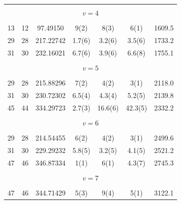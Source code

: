 \documentclass[twocolumn]{aastex62}
\begin{document}
\begin{table}[h!]
\begin{tabular}{ccccccc}
&\vspace{-0.75em}\\
\multicolumn{7}{c}{$v = 4$} \\
\vspace{-0.75em}\\

13 & 12 & 97.49150 & 9(2)		& 8(3) 		& 6(1) & 1609.5 \\
29 & 28 & 217.22742 & 1.7(6)	& 3.2(6) 	& 3.5(6) & 1733.2 \\
31 & 30 & 232.16021 & 6.7(6)	& 3.9(6)	& 6.6(8) & 1755.1 \\

&\vspace{-0.75em}\\
\multicolumn{7}{c}{$v = 5$} \\
\vspace{-0.75em}\\

29 & 28 & 215.88296 & 7(2) 		& 4(2)		& 3(1) & 2118.0 \\
31 & 30 & 230.72302 & 6.5(4)	& 4.3(4) 	& 5.2(5) & 2139.8 \\
45 & 44 & 334.29723 & 2.7(3)	& 16.6(6)	& 42.3(5) & 2332.2 \\

&\vspace{-0.75em}\\
\multicolumn{7}{c}{$v = 6$} \\
\vspace{-0.75em}\\

29 & 28 & 214.54455 & 6(2)		& 4(2) 		& 3(1) & 2499.6 \\
31 & 30 & 229.29232 & 5.8(5)	& 3.2(5) 	& 4.1(5) & 2521.2 \\
47 & 46 & 346.87334 & 1(1)		& 6(1) 		& 4.3(7) & 2745.3 \\

&\vspace{-0.75em}\\
\multicolumn{7}{c}{$v = 7$} \\
\vspace{-0.75em}\\

47 & 46 & 344.71429 & 5(3)		& 9(4) 		& 5(1) & 3122.1 \\

\hline
\end{tabular}

\par 
\end{table}


\end{document}
